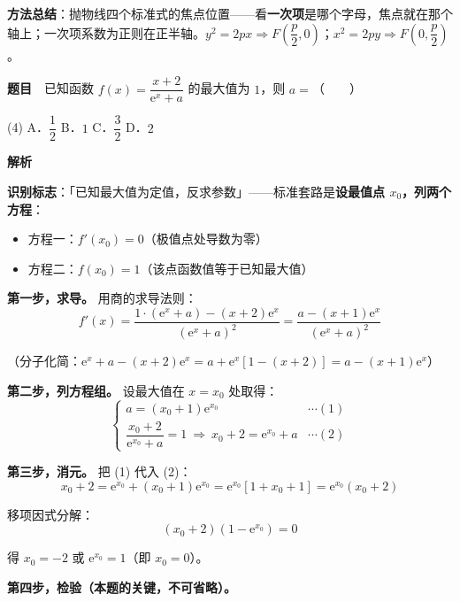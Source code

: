 
\begin{gktip}
\textbf{方法总结}：抛物线四个标准式的焦点位置——看\textbf{一次项}是哪个字母，焦点就在那个轴上；一次项系数为正则在正半轴。$y^2=2px\Rightarrow F\left(\dfrac p2,0\right)$；$x^2=2py\Rightarrow F\left(0,\dfrac p2\right)$。
\end{gktip}

\par\medskip


\textbf{题目}　已知函数 $f(x)=\dfrac{x+2}{\mathrm{e}^{x}+a}$ 的最大值为 $1$，则 $a=$（　　）

\begin{gkopts}(4)
\task A．$\dfrac12$
\task B．$1$
\task C．$\dfrac32$
\task D．$2$
\end{gkopts}

\textbf{解析}

\textbf{识别标志}：「已知最大值为定值，反求参数」——标准套路是\textbf{设最值点 $x_0$，列两个方程}：
\begin{itemize}
\item 方程一：$f'(x_0)=0$（极值点处导数为零）
\item 方程二：$f(x_0)=1$（该点函数值等于已知最大值）
\end{itemize}

\textbf{第一步，求导。} 用商的求导法则：
\[f'(x)=\frac{1\cdot(\mathrm{e}^{x}+a)-(x+2)\mathrm{e}^{x}}{(\mathrm{e}^{x}+a)^2}=\frac{a-(x+1)\mathrm{e}^{x}}{(\mathrm{e}^{x}+a)^2}\]

（分子化简：$\mathrm{e}^x+a-(x+2)\mathrm{e}^x=a+\mathrm{e}^x\left[1-(x+2)\right]=a-(x+1)\mathrm{e}^x$）

\textbf{第二步，列方程组。} 设最大值在 $x=x_0$ 处取得：
\[\begin{cases}a=(x_0+1)\mathrm{e}^{x_0}&\cdots(1)\\[2mm] \dfrac{x_0+2}{\mathrm{e}^{x_0}+a}=1\ \Longrightarrow\ x_0+2=\mathrm{e}^{x_0}+a&\cdots(2)\end{cases}\]

\textbf{第三步，消元。} 把 (1) 代入 (2)：
\[x_0+2=\mathrm{e}^{x_0}+(x_0+1)\mathrm{e}^{x_0}=\mathrm{e}^{x_0}\left[1+x_0+1\right]=\mathrm{e}^{x_0}(x_0+2)\]

移项因式分解：
\[(x_0+2)\left(1-\mathrm{e}^{x_0}\right)=0\]

得 $x_0=-2$ 或 $\mathrm{e}^{x_0}=1$（即 $x_0=0$）。

\textbf{第四步，检验（本题的关键，不可省略）。}

